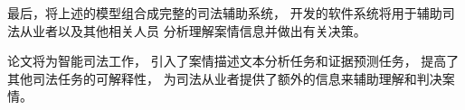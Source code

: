 最后，将上述的模型组合成完整的司法辅助系统，
开发的软件系统将用于辅助司法从业者以及其他相关人员
分析理解案情信息并做出有关决策。

论文将为智能司法工作，
引入了案情描述文本分析任务和证据预测任务，
提高了其他司法任务的可解释性，
为司法从业者提供了额外的信息来辅助理解和判决案情。

